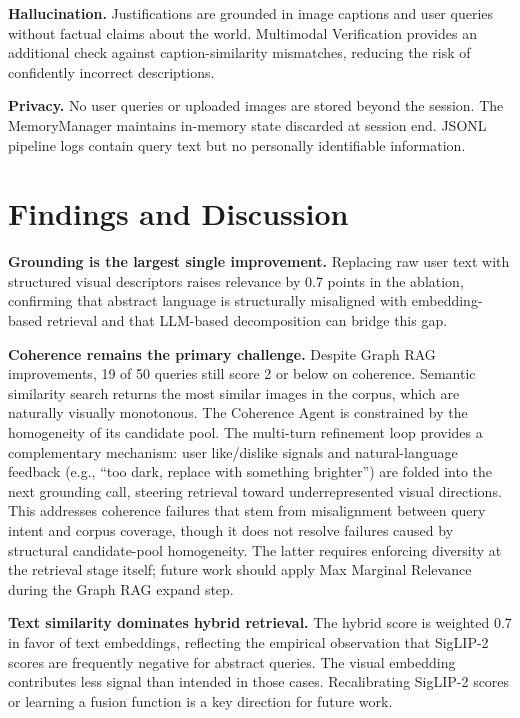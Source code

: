 \documentclass[
  11pt,
]{article}
\begin{document}
\textbf{Hallucination.} Justifications are grounded in image captions
and user queries without factual claims about the world. Multimodal
Verification provides an additional check against caption-similarity
mismatches, reducing the risk of confidently incorrect descriptions.

\textbf{Privacy.} No user queries or uploaded images are stored beyond
the session. The MemoryManager maintains in-memory state discarded at
session end. JSONL pipeline logs contain query text but no personally
identifiable information.

\section{Findings and Discussion}\label{findings-and-discussion}

\textbf{Grounding is the largest single improvement.} Replacing raw user
text with structured visual descriptors raises relevance by 0.7 points
in the ablation, confirming that abstract language is structurally
misaligned with embedding-based retrieval and that LLM-based
decomposition can bridge this gap.

\textbf{Coherence remains the primary challenge.} Despite Graph RAG
improvements, 19 of 50 queries still score 2 or below on coherence.
Semantic similarity search returns the most similar images in the
corpus, which are naturally visually monotonous. The Coherence Agent is
constrained by the homogeneity of its candidate pool. The multi-turn
refinement loop provides a complementary mechanism: user like/dislike
signals and natural-language feedback (e.g., ``too dark, replace with
something brighter'') are folded into the next grounding call, steering
retrieval toward underrepresented visual directions. This addresses
coherence failures that stem from misalignment between query intent and
corpus coverage, though it does not resolve failures caused by
structural candidate-pool homogeneity. The latter requires enforcing
diversity at the retrieval stage itself; future work should apply Max
Marginal Relevance during the Graph RAG expand step.

\textbf{Text similarity dominates hybrid retrieval.} The hybrid score is
weighted 0.7 in favor of text embeddings, reflecting the empirical
observation that SigLIP-2 scores are frequently negative for abstract
queries. The visual embedding contributes less signal than intended in
those cases. Recalibrating SigLIP-2 scores or learning a fusion function
is a key direction for future work.
\end{document}
